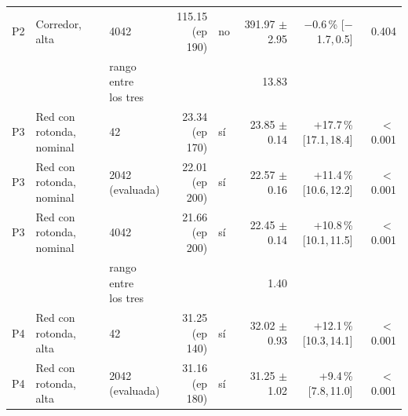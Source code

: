 \begin{table}[H]
\begin{tabular}{lllrlrrr}
P2 & \makecell[l]{Corredor,\\{}alta} & 4042 & \makecell[r]{115.15\\{}(ep 190)} & no & \makecell[r]{391.97\\{}$\pm$ 2.95} & \makecell[r]{$-$0.6\,\%\\{}[$-$1.7,\,0.5]} & 0.404 \\
 & & \makecell[l]{rango entre\\{}los tres} & & & 13.83 & & \\
P3 & \makecell[l]{Red con rotonda,\\{}nominal} & 42 & \makecell[r]{23.34\\{}(ep 170)} & sí & \makecell[r]{23.85\\{}$\pm$ 0.14} & \makecell[r]{+17.7\,\%\\{}[17.1,\,18.4]} & $<$\,0.001 \\
P3 & \makecell[l]{Red con rotonda,\\{}nominal} & \makecell[l]{2042\\{}(evaluada)} & \makecell[r]{22.01\\{}(ep 200)} & sí & \makecell[r]{22.57\\{}$\pm$ 0.16} & \makecell[r]{+11.4\,\%\\{}[10.6,\,12.2]} & $<$\,0.001 \\
P3 & \makecell[l]{Red con rotonda,\\{}nominal} & 4042 & \makecell[r]{21.66\\{}(ep 200)} & sí & \makecell[r]{22.45\\{}$\pm$ 0.14} & \makecell[r]{+10.8\,\%\\{}[10.1,\,11.5]} & $<$\,0.001 \\
 & & \makecell[l]{rango entre\\{}los tres} & & & 1.40 & & \\
P4 & \makecell[l]{Red con rotonda,\\{}alta} & 42 & \makecell[r]{31.25\\{}(ep 140)} & sí & \makecell[r]{32.02\\{}$\pm$ 0.93} & \makecell[r]{+12.1\,\%\\{}[10.3,\,14.1]} & $<$\,0.001 \\
P4 & \makecell[l]{Red con rotonda,\\{}alta} & \makecell[l]{2042\\{}(evaluada)} & \makecell[r]{31.16\\{}(ep 180)} & sí & \makecell[r]{31.25\\{}$\pm$ 1.02} & \makecell[r]{+9.4\,\%\\{}[7.8,\,11.0]} & $<$\,0.001 \\

\end{tabular}
\end{table}
